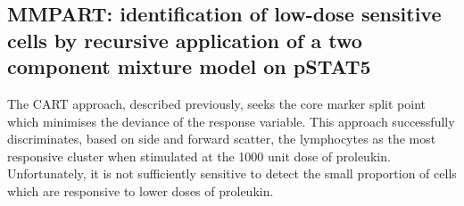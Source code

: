 
%

\clearpage


\subsection{MMPART: identification of low-dose sensitive cells by recursive application of a two component mixture model on pSTAT5}

The CART approach, described previously, seeks the core marker split point which minimises the deviance of the response variable.
This approach successfully discriminates, based on side and forward scatter, the lymphocytes as the most responsive cluster
when stimulated at the 1000 unit dose of proleukin.
Unfortunately, it is not sufficiently sensitive to detect the small proportion of cells which are responsive to lower doses of proleukin.

